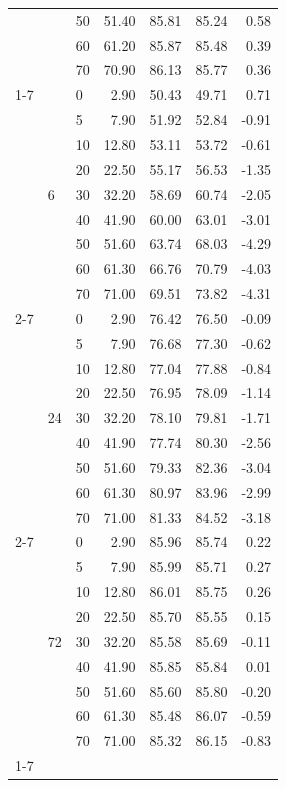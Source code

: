 \begin{table}
\begin{tabular}{lllrrrr}
 &  & 50 & 51.40 & 85.81 & 85.24 & 0.58 \\
 &  & 60 & 61.20 & 85.87 & 85.48 & 0.39 \\
 &  & 70 & 70.90 & 86.13 & 85.77 & 0.36 \\
\cline{1-7} \cline{2-7}
\multirow[t]{27}{*}{out} & \multirow[t]{9}{*}{6} & 0 & 2.90 & 50.43 & 49.71 & 0.71 \\
 &  & 5 & 7.90 & 51.92 & 52.84 & -0.91 \\
 &  & 10 & 12.80 & 53.11 & 53.72 & -0.61 \\
 &  & 20 & 22.50 & 55.17 & 56.53 & -1.35 \\
 &  & 30 & 32.20 & 58.69 & 60.74 & -2.05 \\
 &  & 40 & 41.90 & 60.00 & 63.01 & -3.01 \\
 &  & 50 & 51.60 & 63.74 & 68.03 & -4.29 \\
 &  & 60 & 61.30 & 66.76 & 70.79 & -4.03 \\
 &  & 70 & 71.00 & 69.51 & 73.82 & -4.31 \\
\cline{2-7}
 & \multirow[t]{9}{*}{24} & 0 & 2.90 & 76.42 & 76.50 & -0.09 \\
 &  & 5 & 7.90 & 76.68 & 77.30 & -0.62 \\
 &  & 10 & 12.80 & 77.04 & 77.88 & -0.84 \\
 &  & 20 & 22.50 & 76.95 & 78.09 & -1.14 \\
 &  & 30 & 32.20 & 78.10 & 79.81 & -1.71 \\
 &  & 40 & 41.90 & 77.74 & 80.30 & -2.56 \\
 &  & 50 & 51.60 & 79.33 & 82.36 & -3.04 \\
 &  & 60 & 61.30 & 80.97 & 83.96 & -2.99 \\
 &  & 70 & 71.00 & 81.33 & 84.52 & -3.18 \\
\cline{2-7}
 & \multirow[t]{9}{*}{72} & 0 & 2.90 & 85.96 & 85.74 & 0.22 \\
 &  & 5 & 7.90 & 85.99 & 85.71 & 0.27 \\
 &  & 10 & 12.80 & 86.01 & 85.75 & 0.26 \\
 &  & 20 & 22.50 & 85.70 & 85.55 & 0.15 \\
 &  & 30 & 32.20 & 85.58 & 85.69 & -0.11 \\
 &  & 40 & 41.90 & 85.85 & 85.84 & 0.01 \\
 &  & 50 & 51.60 & 85.60 & 85.80 & -0.20 \\
 &  & 60 & 61.30 & 85.48 & 86.07 & -0.59 \\
 &  & 70 & 71.00 & 85.32 & 86.15 & -0.83 \\
\cline{1-7} \cline{2-7}
\bottomrule
\end{tabular}
\end{table}
